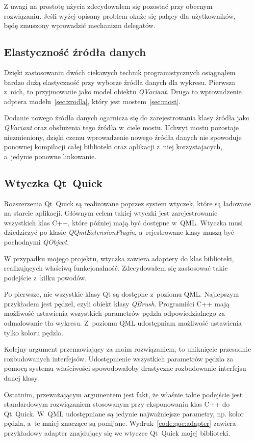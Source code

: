 Z uwagi na prostotę użycia zdecydowałem się pozostać przy obecnym rozwiązaniu. Jeśli wyżej opisany problem okaże się palący dla użytkowników, będę zmuszony wprowadzić mechanizm delegatów.

\subsection{Elastyczność źródła danych}\label{sub:flexible}
Dzięki zastosowaniu dwóch ciekawych technik programistycznych osiągnąłem bardzo dużą elastyczność przy wyborze źródła danych dla wykresu. Pierwsza z~nich, to przyjmowanie jako model obiektu \textit{QVariant}. Druga to wprowadzenie adptera modelu~\ref{sec:zrodla}, który jest mostem~\ref{sec:most}.

Dodanie nowego źródła danych ogarnicza się do zarejestrowania klasy źródła jako \textit{QVariant} oraz obsłużenia tego źródła w~ciele mostu. Uchwyt mostu pozostaje niezmieniony, dzięki czemu wprowadzenie nowego źródła danych nie spowoduje ponownej kompilacji całej biblioteki oraz aplikacji z~niej korzystajacych, a~jedynie ponowne linkowanie.

\subsection{Wtyczka Qt~Quick}
Rozszerzenia Qt~Quick są realizowane poprzez system wtyczek, które są ładowane na starcie aplikacji. Głównym celem takiej wtyczki jest zarejestrowanie wszystkich klas C++, które później mają być dostępne w~QML. Wtyczka musi dziedziczyć po klasie \textit{QQmlExtensionPlugin}, a~rejestrowane klasy muszą być pochodnymi \textit{QObject}.

W przypadku mojego projektu, wtyczka zawiera adaptery do klas biblioteki, realizujących właściwą funkcjonalność. Zdecydowałem się zastosować takie podejście z~kilku powodów.

Po pierwsze, nie wszystkie klasy Qt są dostępne z~poziomu QML. Najlepszym przykładem jest pędzel, czyli obiekt klasy \textit{QBrush}. Programiści C++ mają możliwość ustawienia wszystkich parametrów pędzla odpowiedzialnego za odmalowanie tła wykresu. Z~poziomu QML udostępniam możliwość ustawienia tylko koloru pędzla.

Kolejny argument przemawiający za moim rozwiązaniem, to uniknięcie przesadnie rozbudowanych interfejsów. Udostępnienie wszystkich parametrów pędzla za pomocą systemu właściwości spowodowałoby drastyczne rozbudowanie interfejsu danej klasy.

Ostatnim, przeważającym argumentem jest fakt, że właśnie takie podejście jest standardowym rozwiązaniem stosowanym przy eksponowaniu klas C++ do Qt~Quick. W~QML udostępniane są jedynie najważniejsze parametry, np. kolor pędzla, a~te mniej znaczące są pomijane. Wydruk~\ref{code:qoc:adapter} zawiera przykładowy adapter znajdujący się we wtyczce Qt~Quick mojej biblioteki.

